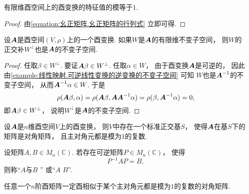 \begin{proposition}
有限维酉空间上的酉变换的特征值的模等于\(1\).
\begin{proof}
由\cref{equation:幺正矩阵.幺正矩阵的行列式} 立即可得.
\end{proof}
\end{proposition}

\begin{proposition}
设\(\boldsymbol{A}\)是酉空间\((V,\rho)\)上的一个酉变换.
如果\(W\)是\(\boldsymbol{A}\)的有限维不变子空间，
则\(W\)的正交补\(W^\perp\)也是\(\boldsymbol{A}\)的不变子空间.
\begin{proof}
任取\(\beta \in W^\perp\).
要证\(\boldsymbol{A}\beta \in W^\perp\).
任取\(\alpha \in W\)，
由于酉变换\(\boldsymbol{A}\)是可逆的，
因此由\cref{example:线性映射.可逆线性变换的逆变换的不变子空间} 可知
\(W\)也是\(\boldsymbol{A}^{-1}\)的不变子空间，
从而\(\boldsymbol{A}^{-1}\alpha \in W\).
于是\begin{equation*}
	\rho(\boldsymbol{A}\beta,\alpha)
	= \rho(\boldsymbol{A}\beta,\boldsymbol{A}\boldsymbol{A}^{-1}\alpha)
	= \rho(\beta,\boldsymbol{A}^{-1}\alpha)
	= 0,
\end{equation*}
即\(\boldsymbol{A}\beta \in W^\perp\)，
说明\(W^\perp\)是\(\boldsymbol{A}\)的不变子空间.
\end{proof}
\end{proposition}

\begin{theorem}
设\(\boldsymbol{A}\)是\(n\)维酉空间\(V\)上的酉变换，
则\(V\)中存在一个标准正交基\(S\)，
使得\(\boldsymbol{A}\)在基\(S\)下的矩阵是对角矩阵，
且主对角元都是模为\(1\)的复数.
\end{theorem}

\begin{definition}
设矩阵\(A,B \in M_n(\mathbb{C})\).
若存在可逆矩阵\(P \in M_n(\mathbb{C})\)，
使得\begin{equation}
	P^{-1} A P = B,
\end{equation}
则称“\(A\)与\(B\) ”
或“\(A\)  \(B\)”.
\end{definition}

\begin{corollary}
任意一个\(n\)阶酉矩阵一定酉相似于某个主对角元都是模为\(1\)的复数的对角矩阵.
\end{corollary}

